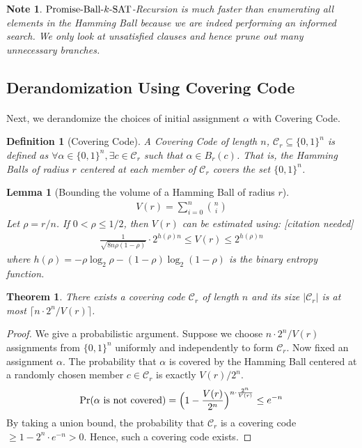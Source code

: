 \documentclass[a4paper,12pts]{article}
\newcommand{\SAT}{\textnormal{$k$-SAT}}
\newcommand{\ball}[2]{B_{#1}(#2)}
\newcommand{\PBS}{\textnormal{Promise-Ball-$\SAT$}}
\newcommand{\cc}{\mathcal{C}}
\newcommand{\bits}{\{0,1\}}
\renewcommand{\Pr}{\textnormal{Pr}}
\newtheorem{definition}{Definition}
\newtheorem{theorem}{Theorem}
\newtheorem*{note}{Note}
\newtheorem{lemma}{Lemma}
\begin{document}
\begin{note}
	$\PBS$-Recursion is much faster than enumerating all elements in the Hamming Ball because we are indeed performing an informed search. We only look at unsatisfied clauses and hence prune out many unnecessary branches.
\end{note}
\subsection{Derandomization Using Covering Code}
\paragraph{} Next, we derandomize the choices of initial assignment $\alpha$ with Covering Code. \par 
\begin{definition}[Covering Code]
	A Covering Code of length $n$, $\cc_r \subseteq \bits^n$ is defined as $\forall \alpha \in \bits^n, \exists c \in \cc_r$ such that $\alpha \in \ball{r}{c}$. That is, the Hamming Balls of radius $r$ centered at each member of $\cc_r$ covers the set $\bits^n$.
\end{definition}
\begin{lemma}[Bounding the volume of a Hamming Ball of radius $r$]
	\begin{align*}
	V(r) = \sum_{i = 0}^{n} {n \choose i}
	\end{align*}
	Let $\rho = r/n$. If $0 < \rho \leq 1/2$, then $V(r)$ can be estimated using: [citation needed]
	\begin{align*}
	\frac{1}{\sqrt{8n\rho(1-\rho)}} \cdot 2^{h(\rho)n} \leq V(r) \leq 2^{h(\rho)n}
	\end{align*}
	where $h(\rho) = -\rho \log_2 \rho - (1-\rho)\log_2(1-\rho)$ is the binary entropy function.
\end{lemma}
\begin{theorem}
	There exists a covering code $\cc_r$ of length $n$ and its size $|\cc_r|$ is at most $\lceil n\cdot 2^n / V(r) \rceil$.
\end{theorem}
\begin{proof}
	We give a probabilistic argument. Suppose we choose $ n\cdot 2^n / V(r)$ assignments from $\bits^n$ uniformly and independently to form $\cc_r$. Now fixed an assignment $\alpha$. The probability that $\alpha$ is covered by the Hamming Ball centered at a randomly chosen member $c \in \cc_r$ is exactly $V(r)/2^n$. 
	\begin{align*}
	\Pr(\text{$\alpha$ is not covered}) = \Big(1-\frac{V(r)}{2^n}\Big)^{n\cdot \frac{2^n}{V(r)}} \leq e^{-n}
	\end{align*}
	By taking a union bound, the probability that $\cc_r$ is a covering code $\geq 1 - 2^n\cdot e^{-n} > 0$. Hence, such a covering code exists. 
\end{proof}
\end{document}
